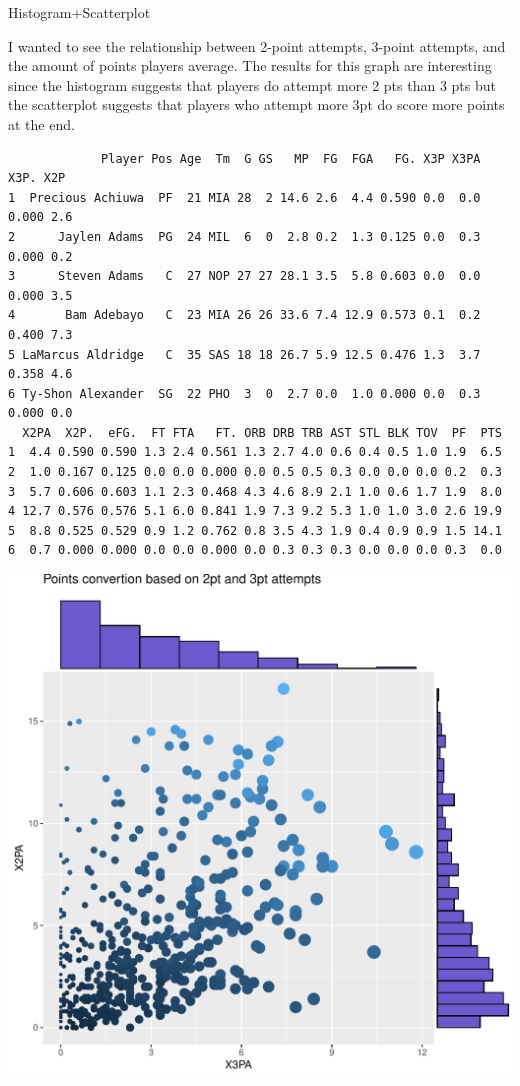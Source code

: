 \documentclass[
]{article}
\begin{document}
Histogram+Scatterplot

I wanted to see the relationship between 2-point attempts, 3-point
attempts, and the amount of points players average. The results for this
graph are interesting since the histogram suggests that players do
attempt more 2 pts than 3 pts but the scatterplot suggests that players
who attempt more 3pt do score more points at the end.

\begin{verbatim}
             Player Pos Age  Tm  G GS   MP  FG  FGA   FG. X3P X3PA  X3P. X2P
1  Precious Achiuwa  PF  21 MIA 28  2 14.6 2.6  4.4 0.590 0.0  0.0 0.000 2.6
2      Jaylen Adams  PG  24 MIL  6  0  2.8 0.2  1.3 0.125 0.0  0.3 0.000 0.2
3      Steven Adams   C  27 NOP 27 27 28.1 3.5  5.8 0.603 0.0  0.0 0.000 3.5
4       Bam Adebayo   C  23 MIA 26 26 33.6 7.4 12.9 0.573 0.1  0.2 0.400 7.3
5 LaMarcus Aldridge   C  35 SAS 18 18 26.7 5.9 12.5 0.476 1.3  3.7 0.358 4.6
6 Ty-Shon Alexander  SG  22 PHO  3  0  2.7 0.0  1.0 0.000 0.0  0.3 0.000 0.0
  X2PA  X2P.  eFG.  FT FTA   FT. ORB DRB TRB AST STL BLK TOV  PF  PTS
1  4.4 0.590 0.590 1.3 2.4 0.561 1.3 2.7 4.0 0.6 0.4 0.5 1.0 1.9  6.5
2  1.0 0.167 0.125 0.0 0.0 0.000 0.0 0.5 0.5 0.3 0.0 0.0 0.0 0.2  0.3
3  5.7 0.606 0.603 1.1 2.3 0.468 4.3 4.6 8.9 2.1 1.0 0.6 1.7 1.9  8.0
4 12.7 0.576 0.576 5.1 6.0 0.841 1.9 7.3 9.2 5.3 1.0 1.0 3.0 2.6 19.9
5  8.8 0.525 0.529 0.9 1.2 0.762 0.8 3.5 4.3 1.9 0.4 0.9 0.9 1.5 14.1
6  0.7 0.000 0.000 0.0 0.0 0.000 0.0 0.3 0.3 0.3 0.0 0.0 0.0 0.3  0.0
\end{verbatim}

\begin{center}\includegraphics{./figures/unnamed-chunk-4-1} \end{center}
\end{document}
